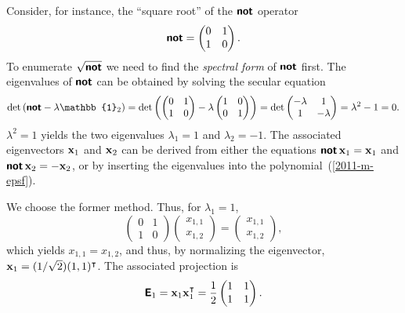 {Consider, for instance, the ``square root''  of the $\textsf{\textbf{not}}$ operator
\begin{equation}
\textsf{\textbf{not}}
=
\begin{pmatrix}
 0&1\\  1&0
\end{pmatrix}.
\end{equation}
To enumerate $\sqrt{\textsf{\textbf{not}}}$  we need to find the {\em spectral form} of $\textsf{\textbf{not}}$ first.
The eigenvalues of  $\textsf{\textbf{not}}$ can be obtained by solving the
secular equation
\begin{equation}
\text{det}
\left(
\textsf{\textbf{not}} - \lambda \mathbb{1}_2
\right)
=
\text{det}
\left(
\begin{pmatrix}
 0&1\\  1&0
\end{pmatrix}
-
\lambda
\begin{pmatrix}
1&0\\  0&1
\end{pmatrix}
\right)
=
\text{det}
\begin{pmatrix}
 -\lambda&1\\
1&-\lambda
\end{pmatrix}
   =\lambda^2-1=0.
\end{equation}
$\lambda^2=1$ yields the two eigenvalues
$\lambda_1=1$
and
$\lambda_2=-1$.
The associated eigenvectors
${\bf x}_1$
and
${\bf x}_2$
can be derived from either the equations
$\textsf{\textbf{not}}\,{\bf x}_1={\bf x}_1$
and
$\textsf{\textbf{not}}\,{\bf x}_2=-{\bf x}_2$,
or by inserting the eigenvalues into the polynomial~(\ref{2011-m-epsf}).

We choose the former method.
Thus, for $\lambda_1=1$,
\begin{equation}
\begin{pmatrix}
 0&1\\  1&0
\end{pmatrix}
\begin{pmatrix}
x_{1,1}\\x_{1,2}
\end{pmatrix}
=\begin{pmatrix}
x_{1,1}\\x_{1,2}
\end{pmatrix}
,
\end{equation}
which yields  $x_{1,1}=x_{1,2}$, and thus, by normalizing the eigenvector,
${\bf x}_1=(1/\sqrt{2})(1,1)^\intercal $.
The associated projection is
\begin{equation}
\textsf{\textbf{E}}_1={\bf x}_1{\bf x}_1^\intercal =\frac{1}{2}
\begin{pmatrix}
 1&1\\  1&1
\end{pmatrix}
.
\end{equation}


}
